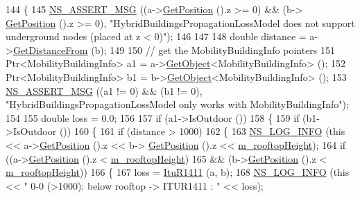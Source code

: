\begin{DoxyCode}
144 \{
145   \hyperlink{assert_8h_aff5ece9066c74e681e74999856f08539}{NS\_ASSERT\_MSG} ((a->\hyperlink{classns3_1_1MobilityModel_aba838f06ec5bbb2d193d94b8c0e4abb4}{GetPosition} ().z >= 0) && (b->
      \hyperlink{classns3_1_1MobilityModel_aba838f06ec5bbb2d193d94b8c0e4abb4}{GetPosition} ().z >= 0), \textcolor{stringliteral}{"HybridBuildingsPropagationLossModel does not support underground nodes
       (placed at z < 0)"});
146 
147   
148   \textcolor{keywordtype}{double} distance = a->\hyperlink{classns3_1_1MobilityModel_afa16c20b3c5fd135be075000f0272f31}{GetDistanceFrom} (b);
149 
150   \textcolor{comment}{// get the MobilityBuildingInfo pointers}
151   Ptr<MobilityBuildingInfo> a1 = a->\hyperlink{classns3_1_1Object_a13e18c00017096c8381eb651d5bd0783}{GetObject}<MobilityBuildingInfo> ();
152   Ptr<MobilityBuildingInfo> b1 = b->\hyperlink{classns3_1_1Object_a13e18c00017096c8381eb651d5bd0783}{GetObject}<MobilityBuildingInfo> ();
153   \hyperlink{assert_8h_aff5ece9066c74e681e74999856f08539}{NS\_ASSERT\_MSG} ((a1 != 0) && (b1 != 0), \textcolor{stringliteral}{"HybridBuildingsPropagationLossModel only works with
       MobilityBuildingInfo"});
154 
155   \textcolor{keywordtype}{double} loss = 0.0;
156 
157   \textcolor{keywordflow}{if} (a1->IsOutdoor ())
158     \{
159       \textcolor{keywordflow}{if} (b1->IsOutdoor ())
160         \{
161           \textcolor{keywordflow}{if} (distance > 1000)
162             \{
163               \hyperlink{group__logging_gafbd73ee2cf9f26b319f49086d8e860fb}{NS\_LOG\_INFO} (\textcolor{keyword}{this} << a->\hyperlink{classns3_1_1MobilityModel_aba838f06ec5bbb2d193d94b8c0e4abb4}{GetPosition} ().z << b->
      \hyperlink{classns3_1_1MobilityModel_aba838f06ec5bbb2d193d94b8c0e4abb4}{GetPosition} ().z << \hyperlink{classns3_1_1HybridBuildingsPropagationLossModel_a36a81fabbc1c572da78ed3dbf6ba6bb8}{m\_rooftopHeight});
164               \textcolor{keywordflow}{if} ((a->\hyperlink{classns3_1_1MobilityModel_aba838f06ec5bbb2d193d94b8c0e4abb4}{GetPosition} ().z < \hyperlink{classns3_1_1HybridBuildingsPropagationLossModel_a36a81fabbc1c572da78ed3dbf6ba6bb8}{m\_rooftopHeight})
165                   && (b->\hyperlink{classns3_1_1MobilityModel_aba838f06ec5bbb2d193d94b8c0e4abb4}{GetPosition} ().z < \hyperlink{classns3_1_1HybridBuildingsPropagationLossModel_a36a81fabbc1c572da78ed3dbf6ba6bb8}{m\_rooftopHeight}))
166                 \{
167                   loss = \hyperlink{classns3_1_1HybridBuildingsPropagationLossModel_a96de0ed2ba5a5e579e2c20942ca568fa}{ItuR1411} (a, b);
168                   \hyperlink{group__logging_gafbd73ee2cf9f26b319f49086d8e860fb}{NS\_LOG\_INFO} (\textcolor{keyword}{this} << \textcolor{stringliteral}{" 0-0 (>1000): below rooftop -> ITUR1411 : "} << loss);

\end{DoxyCode}
